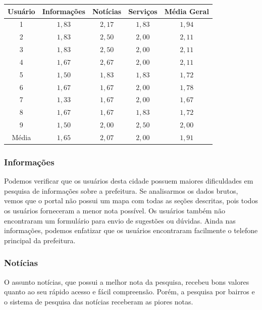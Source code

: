 \documentclass{article}
\begin{document}
\begin{center}
    \begin{tabular}{|c|c|c|c|c|}
        \hline{} Usuário & Informações & Notícias & Serviços & Média Geral\\
        \hline{} 1 & $1,83$ & $2,17$ & $1,83$ & $1,94$\\
        \hline{} 2 & $1,83$ & $2,50$ & $2,00$ & $2,11$\\
        \hline{} 3 & $1,83$ & $2,50$ & $2,00$ & $2,11$\\
        \hline{} 4 & $1,67$ & $2,67$ & $2,00$ & $2,11$\\
        \hline{} 5 & $1,50$ & $1,83$ & $1,83$ & $1,72$\\
        \hline{} 6 & $1,67$ & $1,67$ & $2,00$ & $1,78$\\
        \hline{} 7 & $1,33$ & $1,67$ & $2,00$ & $1,67$\\
        \hline{} 8 & $1,67$ & $1,67$ & $1,83$ & $1,72$\\
        \hline{} 9 & $1,50$ & $2,00$ & $2,50$ & $2,00$\\
        \hline{} Média & $1,65$ & $2,07$ & $2,00$ & $1,91$\\\hline
    \end{tabular}
\end{center}

\subsubsection{Informações}

Podemos verificar que os usuários desta cidade possuem maiores dificuldades em
pesquisa de informações sobre a prefeitura. Se analisarmos os dados brutos,
vemos que o portal não possui um mapa com todas as seções descritas, pois
todos os usuários forneceram a menor nota possível. Os usuários também não
encontraram um formulário para envio de sugestões ou dúvidas. Ainda nas
informações, podemos enfatizar que os usuários encontraram facilmente o telefone
principal da prefeitura.

\subsubsection{Notícias}

O assunto notícias, que possui a melhor nota da pesquisa, recebeu bons valores
quanto ao seu rápido acesso e fácil compreensão. Porém, a pesquisa por bairros e
o sistema de pesquisa das notícias receberam as piores notas.
\end{document}

